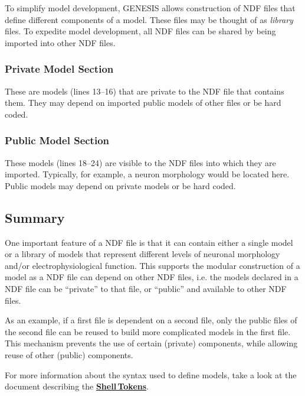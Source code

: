 \documentclass[12pt]{article}
\begin{document}
To simplify model development, GENESIS allows construction of NDF files
that define different components of a model.  These files may be thought of as
\emph{library} files.  To expedite model development, all NDF files
can be shared by being imported into other NDF files.

\subsubsection*{Private Model Section}
These are models (lines 13--16) that are private to the NDF file that contains them.
They may depend on imported public models of other files or be hard
coded.

\subsubsection*{Public Model Section}
These models (lines 18--24) are visible to the NDF files into which they are
imported.  Typically, for example, a neuron morphology would be
located here.  Public models may depend on private models or be hard
coded.

\subsection*{Summary}
One important feature of a NDF file is that it can contain either a single model or a library of models that represent different levels of neuronal morphology and/or electrophysiological function. This supports the modular construction of a model as a NDF file can depend on other NDF files, i.e. the models declared in a NDF file can be ``private'' to that file, or ``public'' and available to other NDF files. 

As an example, if a first file is dependent on a second file, only the public files of the second file can be reused to build more complicated models in the first file. This mechanism prevents the use of certain (private) components, while allowing reuse of other (public) components.

For more information about the syntax used to define models, take a
look at the document describing the
\href{../shell-tokens/shell-tokens.tex}{\bf Shell\,Tokens}.


\end{document}
